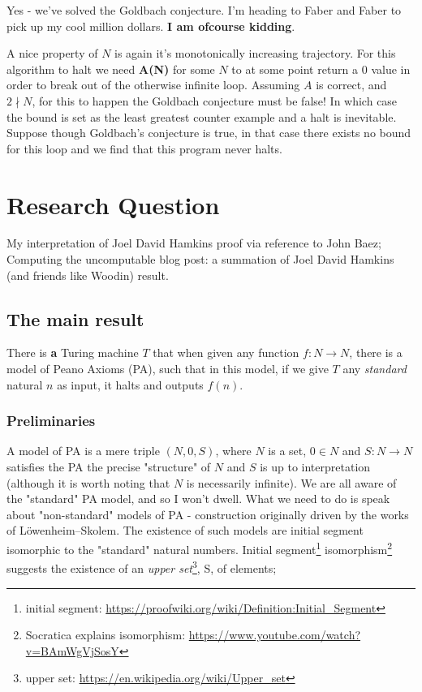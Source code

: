 \documentclass{article}
\begin{document}
Yes - we've solved the Goldbach conjecture. I'm heading to Faber and Faber to pick up my cool million dollars. \textbf{I am ofcourse kidding}. 

A nice property of $N$ is again it's monotonically increasing trajectory. For this algorithm to halt we need \textbf{A(N)} for some $N$ to at some point return a $0$ value in order to break out of the otherwise infinite loop. Assuming $A$ is correct, and $2 \nmid N$, for this to happen the Goldbach conjecture must be false! In which case the bound is set as the least greatest counter example and a halt is inevitable. Suppose though Goldbach's conjecture is true, in that case there exists no bound for this loop and we find that this program never halts.

\pagebreak
\section{Research Question}
My interpretation of Joel David Hamkins proof via reference to John Baez; Computing the uncomputable blog post: a summation of Joel David Hamkins (and friends like Woodin) result.

\subsection{The main result}
There is \textbf{a} Turing machine $T$ that when given any function $f: N \rightarrow N$, there is a model of Peano Axioms (PA), such that in this model, if we give $T$ any \emph{standard} natural $n$ as input, it halts and outputs $f(n)$.

\subsubsection{Preliminaries}
A model of PA is a mere triple $(N, 0, S)$, where $N$ is a set, $0 \in N$ and $S: N \rightarrow N$ satisfies the PA the precise "structure" of $N$ and $S$ is up to interpretation (although it is worth noting that $N$ is necessarily infinite). We are all aware of the "standard" PA model, and so I won't dwell. What we need to do is speak about "non-standard" models of PA - construction originally driven by the works of Löwenheim–Skolem. The existence of such models are initial segment isomorphic to the "standard" natural numbers. Initial segment\footnote{initial segment: \url{https://proofwiki.org/wiki/Definition:Initial_Segment}} isomorphism\footnote{Socratica explains isomorphism: \url{https://www.youtube.com/watch?v=BAmWgVjSosY}} suggests the existence of an \emph{upper set}\footnote{upper set: \url{https://en.wikipedia.org/wiki/Upper_set}}, S, of elements;
\end{document}
